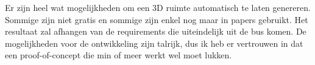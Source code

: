 \documentclass{hogent-article}
\begin{document}
Er zijn heel wat mogelijkheden om een 3D ruimte automatisch te laten genereren. Sommige zijn niet gratis en sommige zijn enkel nog maar in papers gebruikt. Het resultaat zal afhangen van de requirements die uiteindelijk uit de bus komen. De mogelijkheden voor de ontwikkeling zijn talrijk, dus ik heb er vertrouwen in dat een proof-of-concept die min of meer werkt wel moet lukken.  







\printbibliography[heading=bibintoc]
\end{document}
